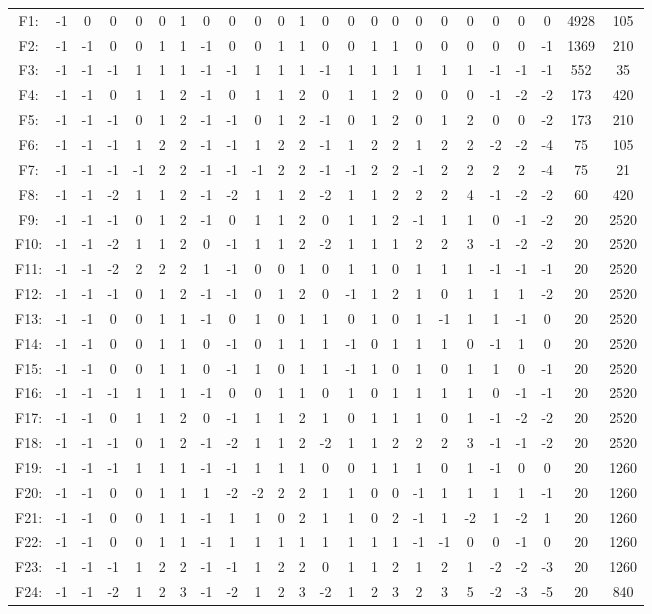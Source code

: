 \documentclass[12pt]{article}
\begin{document}
\begin{center}
\scriptsize
\begin{tabular}{cccccccccccccccccccccc|c|c}
F1:&-1&0&0&0&0&1&0&0&0&0&1&0&0&0&0&0&0&0&0&0&0&4928&105\\
F2:&-1&-1&0&0&1&1&-1&0&0&1&1&0&0&1&1&0&0&0&0&0&-1&1369&210\\
F3:&-1&-1&-1&1&1&1&-1&-1&1&1&1&-1&1&1&1&1&1&1&-1&-1&-1&552&35\\
F4:&-1&-1&0&1&1&2&-1&0&1&1&2&0&1&1&2&0&0&0&-1&-2&-2&173&420\\
F5:&-1&-1&-1&0&1&2&-1&-1&0&1&2&-1&0&1&2&0&1&2&0&0&-2&173&210\\
F6:&-1&-1&-1&1&2&2&-1&-1&1&2&2&-1&1&2&2&1&2&2&-2&-2&-4&75&105\\
F7:&-1&-1&-1&-1&2&2&-1&-1&-1&2&2&-1&-1&2&2&-1&2&2&2&2&-4&75&21\\
F8:&-1&-1&-2&1&1&2&-1&-2&1&1&2&-2&1&1&2&2&2&4&-1&-2&-2&60&420\\
F9:&-1&-1&-1&0&1&2&-1&0&1&1&2&0&1&1&2&-1&1&1&0&-1&-2&20&2520\\
F10:&-1&-1&-2&1&1&2&0&-1&1&1&2&-2&1&1&1&2&2&3&-1&-2&-2&20&2520\\
F11:&-1&-1&-2&2&2&2&1&-1&0&0&1&0&1&1&0&1&1&1&-1&-1&-1&20&2520\\
F12:&-1&-1&-1&0&1&2&-1&-1&0&1&2&0&-1&1&2&1&0&1&1&1&-2&20&2520\\
F13:&-1&-1&0&0&1&1&-1&0&1&0&1&1&0&1&0&1&-1&1&1&-1&0&20&2520\\
F14:&-1&-1&0&0&1&1&0&-1&0&1&1&1&-1&0&1&1&1&0&-1&1&0&20&2520\\
F15:&-1&-1&0&0&1&1&0&-1&1&0&1&1&-1&1&0&1&0&1&1&0&-1&20&2520\\
F16:&-1&-1&-1&1&1&1&-1&0&0&1&1&0&1&0&1&1&1&1&0&-1&-1&20&2520\\
F17:&-1&-1&0&1&1&2&0&-1&1&1&2&1&0&1&1&1&0&1&-1&-2&-2&20&2520\\
F18:&-1&-1&-1&0&1&2&-1&-2&1&1&2&-2&1&1&2&2&2&3&-1&-1&-2&20&2520\\
F19:&-1&-1&-1&1&1&1&-1&-1&1&1&1&0&0&1&1&1&0&1&-1&0&0&20&1260\\
F20:&-1&-1&0&0&1&1&1&-2&-2&2&2&1&1&0&0&-1&1&1&1&1&-1&20&1260\\
F21:&-1&-1&0&0&1&1&-1&1&1&0&2&1&1&0&2&-1&1&-2&1&-2&1&20&1260\\
F22:&-1&-1&0&0&1&1&-1&1&1&1&1&1&1&1&1&-1&-1&0&0&-1&0&20&1260\\
F23:&-1&-1&-1&1&2&2&-1&-1&1&2&2&0&1&1&2&1&2&1&-2&-2&-3&20&1260\\
F24:&-1&-1&-2&1&2&3&-1&-2&1&2&3&-2&1&2&3&2&3&5&-2&-3&-5&20&840\\

\end{tabular}
\end{center}
\end{document}
